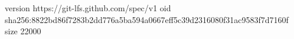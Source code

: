 version https://git-lfs.github.com/spec/v1
oid sha256:8822bd86f7283b2dd776a5ba594a0667eff5c39d2316080f31ac9583f7d7160f
size 22000
